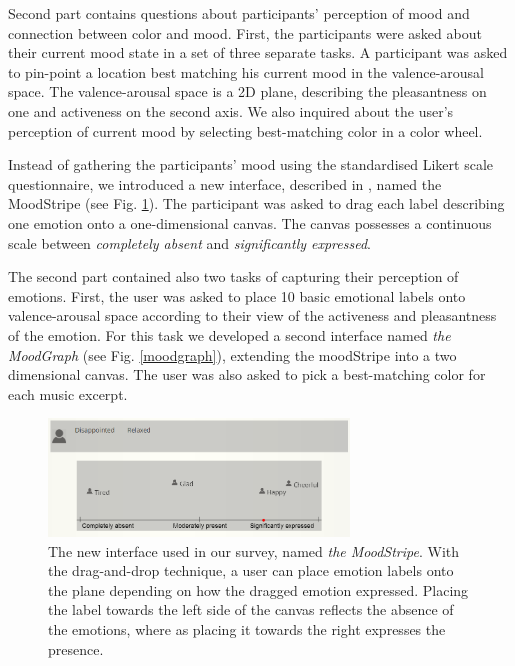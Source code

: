 \documentclass[a4paper]{article}
\begin{document}
Second part contains questions about participants' perception of mood and connection between color and mood. First, the participants were asked about their current mood state in a set of three separate tasks. A participant was asked to pin-point a location best matching his current mood in the valence-arousal space. The valence-arousal space is a 2D plane, describing the pleasantness on one and activeness on the second axis. We also inquired about the user's perception of current mood by selecting best-matching color in a color wheel. 

Instead of gathering the participants' mood using the standardised Likert scale questionnaire, we introduced a new interface, described in \cite{pesek2014gathering}, named the MoodStripe (see Fig. \ref{moodstripe}). The participant was asked to drag each label describing one emotion onto a one-dimensional canvas. The canvas possesses a continuous scale between \textit{completely absent} and \textit{significantly expressed}.

The second part contained also two tasks of capturing their perception of emotions. First, the user was asked to place 10 basic emotional labels onto valence-arousal space according to their view of the activeness and pleasantness of the emotion. For this task we developed a second interface named \textit{the  MoodGraph} (see Fig. \ref{moodgraph}), extending the moodStripe into a two dimensional canvas. The user was also asked to pick a best-matching color for each music excerpt.

\begin{figure}[ht]
\centering
\includegraphics[width=80mm]{moodstripe.png}
\caption{The new interface used in our survey, named \textit{the MoodStripe}. With the drag-and-drop technique, a user can place emotion labels onto the plane depending on how the dragged emotion expressed. Placing the label towards the left side of the canvas reflects the absence of the emotions, where as placing it towards the right expresses the presence.}
\label{moodstripe}
\end{figure}
\end{document}
